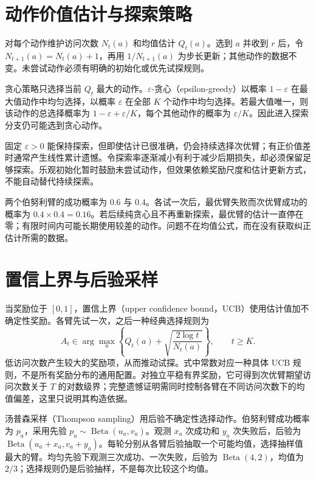 \documentclass[UTF8,12pt,a4paper,fontset=fandol]{ctexbook}
\begin{document}
\section{动作价值估计与探索策略}

对每个动作维护访问次数 $N_t(a)$ 和均值估计 $Q_t(a)$。选到 $a$ 并收到 $r$ 后，令 $N_{t+1}(a)=N_t(a)+1$，再用 $1/N_{t+1}(a)$ 为步长更新；其他动作的数据不变。未尝试动作必须有明确的初始化或优先试探规则。

贪心策略只选择当前 $Q_t$ 最大的动作。$\varepsilon$-贪心（epsilon-greedy）以概率 $1-\varepsilon$ 在最大值动作中均匀选择，以概率 $\varepsilon$ 在全部 $K$ 个动作中均匀选择。若最大值唯一，则该动作的总选择概率为 $1-\varepsilon+\varepsilon/K$，每个其他动作的概率为 $\varepsilon/K$。因此进入探索分支仍可能选到贪心动作。

固定 $\varepsilon>0$ 能保持探索，但即使估计已很准确，仍会持续选择次优臂；有正价值差时通常产生线性累计遗憾。令探索率逐渐减小有利于减少后期损失，却必须保留足够探索。乐观初始化暂时鼓励未尝试动作，但效果依赖奖励尺度和估计更新方式，不能自动替代持续探索。

\begin{example}[初期噪声锁定错误动作]
两个伯努利臂的成功概率为 $0.6$ 与 $0.4$。各试一次后，最优臂失败而次优臂成功的概率为 $0.4\times0.4=0.16$。若后续纯贪心且不再重新探索，最优臂的估计一直停在零；有限时间内可能长期使用较差的动作。问题不在均值公式，而在没有获取纠正估计所需的数据。
\end{example}

\section{置信上界与后验采样}

当奖励位于 $[0,1]$，置信上界（upper confidence bound，UCB）使用估计值加不确定性奖励。各臂先试一次，之后一种经典选择规则为
\[
A_t\in\arg\max_a\left\{Q_t(a)+\sqrt{\frac{2\log t}{N_t(a)}}\right\},\qquad t\geq K.
\]
低访问次数产生较大的奖励项，从而推动试探。式中常数对应一种具体 UCB 规则，不是所有奖励分布的通用配置。对独立平稳有界奖励，它可得到次优臂期望访问次数关于 $T$ 的对数级界\cite{sutton-barto}；完整遗憾证明需同时控制各臂在不同访问次数下的均值偏差，这里只说明其构造依据。

汤普森采样（Thompson sampling）用后验不确定性选择动作。伯努利臂成功概率为 $p_a$，采用先验 $p_a\sim\operatorname{Beta}(u_a,v_a)$。观测 $x_a$ 次成功和 $y_a$ 次失败后，后验为 $\operatorname{Beta}(u_a+x_a,v_a+y_a)$。每轮分别从各臂后验抽取一个可能均值，选择抽样值最大的臂。均匀先验下观测三次成功、一次失败，后验为 $\operatorname{Beta}(4,2)$，均值为 $2/3$；选择规则仍是后验抽样，不是每次比较这个均值。
\end{document}
